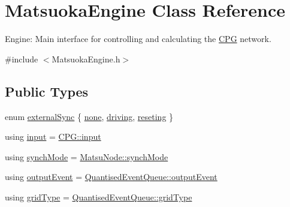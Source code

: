 \hypertarget{classMatsuokaEngine}{}\section{Matsuoka\+Engine Class Reference}
\label{classMatsuokaEngine}


Engine\+: Main interface for controlling and calculating the \hyperlink{classCPG}{C\+PG} network.  




{\ttfamily \#include $<$Matsuoka\+Engine.\+h$>$}

\subsection*{Public Types}
\begin{DoxyCompactItemize}
\item 
enum \hyperlink{classMatsuokaEngine_ad8f471b2f1ca479174d5514b9a3597ec}{external\+Sync} \{ \hyperlink{classMatsuokaEngine_ad8f471b2f1ca479174d5514b9a3597eca4c1d8f9abc3142b344a24624ea7c0a96}{none}, 
\hyperlink{classMatsuokaEngine_ad8f471b2f1ca479174d5514b9a3597ecaf17848b3aa2effcdfd4576b7723ffc7b}{driving}, 
\hyperlink{classMatsuokaEngine_ad8f471b2f1ca479174d5514b9a3597eca66dfc95cb0e1248f30385a100203920c}{reseting}
 \}
\item 
using \hyperlink{classMatsuokaEngine_a811a5449f07004a2eb6b34e8c9bd862f}{input} = \hyperlink{structCPG_1_1input}{C\+P\+G\+::input}
\item 
using \hyperlink{classMatsuokaEngine_acbf2fcb6ddd3b8edc414753248b95fc2}{synch\+Mode} = \hyperlink{classMatsuNode_a725e228db39b8842f851ddf88f640bed}{Matsu\+Node\+::synch\+Mode}
\item 
using \hyperlink{classMatsuokaEngine_a09035e4918ce82c9378821c88375f843}{output\+Event} = \hyperlink{structQuantisedEventQueue_1_1outputEvent}{Quantised\+Event\+Queue\+::output\+Event}
\item 
using \hyperlink{classMatsuokaEngine_aaf41ce5bf63099a1d864e4eb91527cb5}{grid\+Type} = \hyperlink{classQuantisedEventQueue_ae186d50bd503038452edbbdd0c7c259e}{Quantised\+Event\+Queue\+::grid\+Type}
\end{DoxyCompactItemize}

